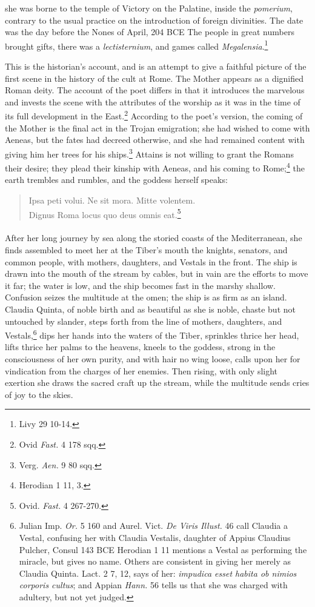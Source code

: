 \documentclass[a4paper, 11pt, oneside, polutonikogreek, french]{article}
\begin{document}
she was borne to the temple of Victory on the Palatine, inside the \emph{pomerium}, contrary to the usual practice on the introduction of foreign divinities. The date was the day before the Nones of April, 204 \textsc{BCE} The people in great numbers brought gifts, there was a \emph{lectisternium}, and games called \emph{Megalensia}.\footnote{Livy 29 10-14.}

This is the historian's account, and is an attempt to give a faithful picture of the first scene in the history of the cult at Rome. The Mother appears as a dignified Roman deity. The account of the poet differs in that it introduces the marvelous and invests the scene with the attributes of the worship as it was in the time of its full development in the East.\footnote{Ovid \emph{Fast.} 4 178 sqq.} According to the poet's version, the coming of the Mother is the final act in the Trojan emigration; she had wished to come with Aeneas, but the fates had decreed otherwise, and she had remained content with giving him her trees for his ships.\footnote{Verg. \emph{Aen.} 9 80 sqq.} Attains is not willing to grant the Romans their desire; they plead their kinship with Aeneas, and his coming to Rome;\footnote{Herodian 1 11, 3.} the earth trembles and rumbles, and the goddess herself speaks:
\begin{quote}
Ipsa peti volui. Ne sit mora. Mitte volentem.\\ Dignus Roma locus quo deus omnis eat.\footnote{Ovid. \emph{Fast.} 4 267-270.}  
\end{quote}
\paragraph{}
After her long journey by sea along the storied coasts of the Mediterranean, she finds assembled to meet her at the Tiber's mouth the knights, senators, and common people, with mothers, daughters, and Vestals in the front. The ship is drawn into the mouth of the stream by cables, but in vain are the efforts to move it far; the water is low, and the ship becomes fast in the marshy shallow. Confusion seizes the multitude at the omen; the ship is as firm as an island. Claudia Quinta, of noble birth and as beautiful as she is noble, chaste but not untouched by slander, steps forth from the line of mothers, daughters, and Vestals,\footnote{Julian Imp. \emph{Or.} 5 160 and Aurel. Vict. \emph{De Viris Illust.} 46 call Claudia a Vestal, confusing her with Claudia Vestalis, daughter of Appius Claudius Pulcher, Consul 143 \textsc{BCE} Herodian 1 11 mentions a Vestal as performing the miracle, but gives no name. Others are consistent in giving her merely as Claudia Quinta. Lact. 2 7, 12, says of her: \emph{impudica esset habita ob nimios corporis cultus}; and Appian \emph{Hann.} 56 tells us that she was charged with adultery, but not yet judged.} dips her hands into the waters of the Tiber, sprinkles thrice her head, lifts thrice her palms to the heavens, kneels to the goddess, strong in the consciousness of her own purity, and with hair no wing loose, calls upon her for vindication from the charges of her enemies. Then rising, with only slight exertion she draws the sacred craft up the stream, while the multitude sends cries of joy to the skies.
\end{document}
